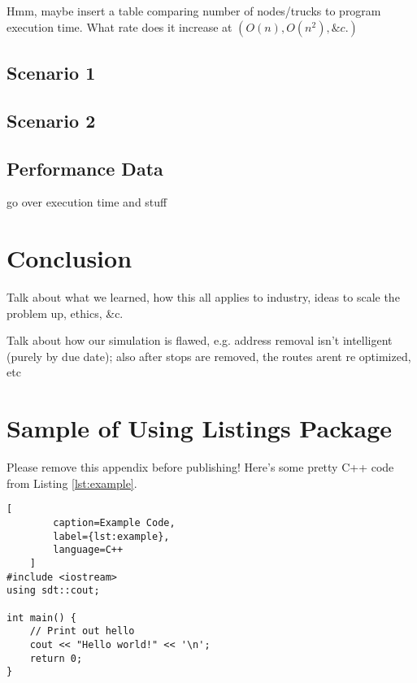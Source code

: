 \documentclass[letterpaper]{article}
\begin{document}
    Hmm, maybe insert a table comparing number of nodes/trucks to program execution time. What rate does it increase at $(O(n), O(n^2), \&c.)$

    \subsection{Scenario 1}

    \subsection{Scenario 2}

    \subsection{Performance Data}
    go over execution time and stuff

    \section{Conclusion}
    \label{section:Conclusion}
    Talk about what we learned, how this all applies to industry, ideas to scale the problem up, ethics, \&c.

    Talk about how our simulation is flawed, e.g. address removal isn't intelligent (purely by due date); also after stops are removed, the routes arent re optimized, etc

    \appendix
    \section{Sample of Using Listings Package}
    Please remove this appendix before publishing! Here's some pretty C++ code from Listing \ref{lst:example}.
    \begin{lstlisting}[
        caption=Example Code,
        label={lst:example},
        language=C++
    ]
#include <iostream>
using sdt::cout;

int main() {
    // Print out hello
    cout << "Hello world!" << '\n';
    return 0;
}\end{lstlisting}
\end{document}
